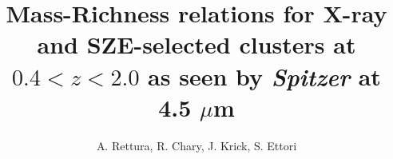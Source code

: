 \documentclass[apj,twocolumn]{emulateapj}
\begin{document}

\title{Mass-Richness relations for X-ray and SZE-selected clusters at $0.4 < z <2.0$ as seen by {\it Spitzer} at 4.5 $\mu$m}



\author{A. Rettura, R. Chary, J. Krick, S. Ettori}





\end{document}
